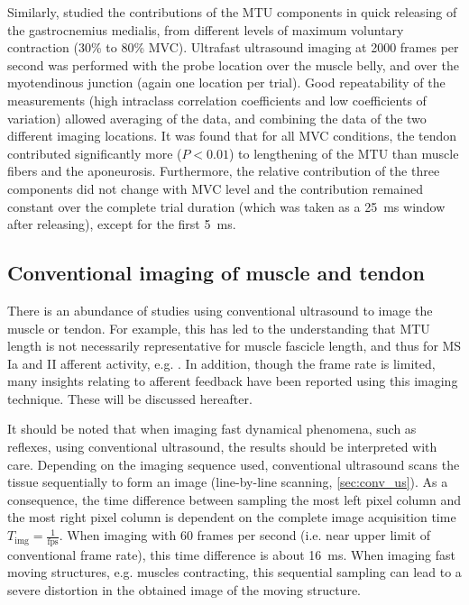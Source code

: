 Similarly, \citet{farcy_interaction_2014} studied the contributions of the MTU components in quick releasing of the gastrocnemius medialis, from different levels of maximum voluntary contraction (30\% to 80\% MVC). Ultrafast ultrasound imaging at 2000 frames per second was performed with the probe location over the muscle belly, and over the myotendinous junction (again one location per trial). Good repeatability of the measurements (high intraclass correlation coefficients and low coefficients of variation) allowed averaging of the data, and combining the data of the two different imaging locations. It was found that for all MVC conditions, the tendon contributed significantly more ($P<0.01$) to lengthening of the MTU than muscle fibers and the aponeurosis. 
Furthermore, the relative contribution of the three components did not change with MVC level and the contribution remained constant over the complete trial duration (which was taken as a \SI{25}{\milli\second} window after releasing), except for the first \SI{5}{\milli\second}. 






\subsection{Conventional imaging of muscle and tendon}
There is an abundance of studies using conventional ultrasound to image the muscle or tendon. For example, this has led to the understanding that MTU length is not necessarily representative for muscle fascicle length, and thus for MS Ia and II afferent activity, e.g. \cite{maas_is_2009, cronin_automatic_2011}. In addition, though the frame rate is limited, many insights relating to afferent feedback have been reported using this imaging technique. These will be discussed hereafter. 

It should be noted that when imaging fast dynamical phenomena, such as reflexes, using conventional ultrasound, the results should be interpreted with care. Depending on the imaging sequence used, conventional ultrasound scans the tissue sequentially to form an image (line-by-line scanning, \autoref{sec:conv_us}). As a consequence, the time difference between sampling the most left pixel column and the most right pixel column is dependent on the complete image acquisition time $T_\text{img} = \frac{1}{\text{fps}}$. When imaging with 60 frames per second (i.e. near upper limit of conventional frame rate), this time difference is about \SI{16}{\milli\second}. When imaging fast moving structures, e.g. muscles contracting, this sequential sampling can lead to a severe distortion in the obtained image of the moving structure.  



